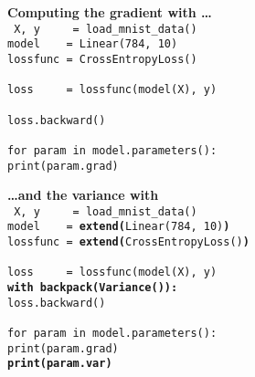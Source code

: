 \begin{figure*}[t]
  \centering
  \hfill
  \begin{minipage}[t]{.48\linewidth}
    \textbf{\!Computing the gradient with \pytorchtitle\ldots}\\[1em]
    \footnotesize
    \texttt{%
      X, y~~~~~= load\_mnist\_data()\\
      model~~~~= Linear(784, 10)\\
      lossfunc~= CrossEntropyLoss()\\
      ~\\
      loss~~~~~= lossfunc(model(X), y)\\
      ~\\
      loss.backward()\\
      ~\\
      for param in model.parameters():~\\
      \null\hspace{2.5em}print(param.grad)
    }
  \end{minipage}\hspace{-0.5em}\vline\hfill
  \begin{minipage}[t]{.48\linewidth}
    \textbf{\!\ldots and the variance with \backpacktitle}\\[1em]
    \footnotesize
    \texttt{%
      X, y~~~~~= load\_mnist\_data()\\
      model~~~~= \textbf{\color{maincolor} extend(}Linear(784, 10)\textbf{\color{maincolor})}\\
      lossfunc~= \textbf{\color{maincolor} extend(}CrossEntropyLoss()\textbf{\color{maincolor})}\\
      ~\\
      loss~~~~~= lossfunc(model(X), y)\\
      \textbf{\color{maincolor} with backpack(Variance()):}\\
      \null\hspace{2.5em}loss.backward()\\
      ~\\
      for param in model.parameters():~\\
      \null\hspace{2.5em}print(param.grad)\\
      \textbf{\color{maincolor} \null\hspace{2.5em}print(param.var)}
    }
  \end{minipage}
  \vspace{-2ex}
  \label{fig:backpack-code-sample}
\end{figure*}

